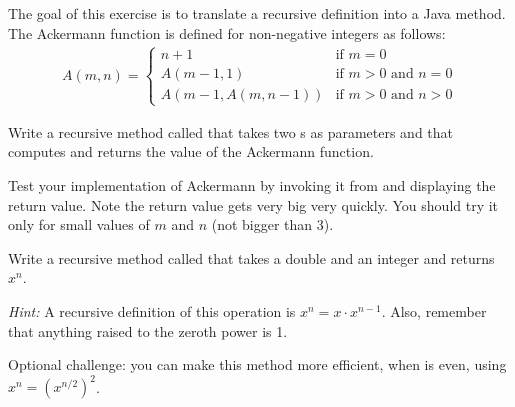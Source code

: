 \begin{exercise}  %

The goal of this exercise is to translate a recursive definition into a Java method.
The Ackermann function is defined for non-negative integers as follows:
\begin{eqnarray*}
A(m, n) = \begin{cases}
              n+1 & \mbox{if } m = 0 \\
        A(m-1, 1) & \mbox{if } m > 0 \mbox{ and } n = 0 \\
A(m-1, A(m, n-1)) & \mbox{if } m > 0 \mbox{ and } n > 0
\end{cases}
\end{eqnarray*}

Write a recursive method called  that takes two s as parameters and that computes and returns the value of the Ackermann function.

Test your implementation of Ackermann by invoking it from  and displaying the return value.
Note the return value gets very big very quickly.
You should try it only for small values of $m$ and $n$ (not bigger than 3).

\end{exercise}


\begin{exercise}  %
\label{ex.power}

Write a recursive method called  that takes a double  and an integer  and returns $x^n$.

{\it Hint:} A recursive definition of this operation is $x^n = x \cdot x^{n-1}$.
Also, remember that anything raised to the zeroth power is 1.

Optional challenge: you can make this method more efficient, when  is even, using $x^n = \left( x^{n/2} \right)^2$.

\end{exercise}


